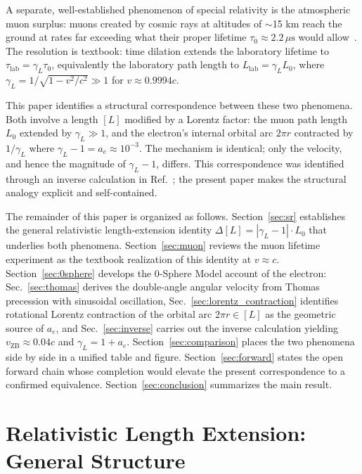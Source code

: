 \documentclass[%
 reprint, amsmath,amssymb, aps, prb, ]{revtex4-2}
\numberwithin{equation}{section}
\newcommand{\vZB}{v_{\text{ZB}}}
\newcommand{\gammaL}{\gamma_{L}}
\begin{document}
A separate, well-established phenomenon of special relativity is the atmospheric muon surplus: muons created by cosmic rays at altitudes of $\sim$15 km reach the ground at rates far exceeding what their proper lifetime $\tau_0 \approx 2.2\,\mu\text{s}$ would allow~\cite{Bailey1977}. The resolution is textbook: time dilation extends the laboratory lifetime to $\tau_{\text{lab}} = \gammaL \tau_0$, equivalently the laboratory path length to $L_{\text{lab}} = \gammaL L_0$, where $\gammaL = 1/\sqrt{1-v^2/c^2} \gg 1$ for $v \approx 0.9994c$.

This paper identifies a structural correspondence between these two phenomena. Both involve a length $[L]$ modified by a Lorentz factor: the muon path length $L_0$ extended by $\gammaL \gg 1$, and the electron's internal orbital arc $2\pi r$ contracted by $1/\gammaL$ where $\gammaL - 1 = a_e \approx 10^{-3}$. The mechanism is identical; only the velocity, and hence the magnitude of $\gammaL - 1$, differs. This correspondence was identified through an inverse calculation in Ref.~\cite{Hanamura_2023_10}; the present paper makes the structural analogy explicit and self-contained.

The remainder of this paper is organized as follows. Section~\ref{sec:sr} establishes the general relativistic length-extension identity $\Delta[L] = |\gammaL-1|\cdot L_0$ that underlies both phenomena. Section~\ref{sec:muon} reviews the muon lifetime experiment as the textbook realization of this identity at $v \approx c$. Section~\ref{sec:0sphere} develops the 0-Sphere Model account of the electron: Sec.~\ref{sec:thomas} derives the double-angle angular velocity from Thomas precession with sinusoidal oscillation, Sec.~\ref{sec:lorentz_contraction} identifies rotational Lorentz contraction of the orbital arc $2\pi r \in [L]$ as the geometric source of $a_e$, and Sec.~\ref{sec:inverse} carries out the inverse calculation yielding $\vZB \approx 0.04c$ and $\gammaL = 1+a_e$. Section~\ref{sec:comparison} places the two phenomena side by side in a unified table and figure. Section~\ref{sec:forward} states the open forward chain whose completion would elevate the present correspondence to a confirmed equivalence. Section~\ref{sec:conclusion} summarizes the main result.

\section{\label{sec:sr}Relativistic Length Extension: General Structure}
\end{document}
